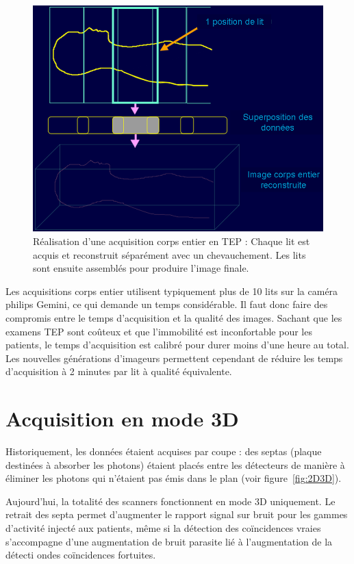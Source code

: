\begin{figure}
\centering
\includegraphics[width=12cm]{images/multilits}
\caption[Acquisitions corps entier en TEP]{Réalisation d'une acquisition corps entier en TEP : Chaque lit est acquis et reconstruit séparément avec un chevauchement. Les lits sont ensuite assemblés pour produire l'image finale.}
\label{fig:multilits}
\end{figure}


Les acquisitions corps entier utilisent typiquement plus de 10 lits sur la caméra philips Gemini, ce qui demande un temps considérable. Il faut donc faire des compromis entre le temps d'acquisition et la qualité des images. Sachant que les examens TEP sont coûteux et que l'immobilité est inconfortable pour les patients, le temps d'acquisition est calibré pour durer moins d'une heure au total. Les nouvelles générations d'imageurs permettent cependant de réduire les temps d'acquisition à 2 minutes par lit à qualité équivalente.


	\section{Acquisition en mode 3D}

Historiquement, les données étaient acquises par coupe : des septas (plaque destinées à absorber les photons) étaient placés entre les détecteurs de manière à éliminer les photons qui n'étaient pas émis dans le plan (voir figure~\ref{fig:2D3D}). 

Aujourd'hui, la totalité des scanners fonctionnent en mode 3D uniquement. Le retrait des septa permet d'augmenter le rapport signal sur bruit pour les gammes d'activité injecté aux patients, même si la détection des coïncidences vraies s'accompagne d'une augmentation de bruit parasite lié à l'augmentation de la détecti ondes coïncidences fortuites.


